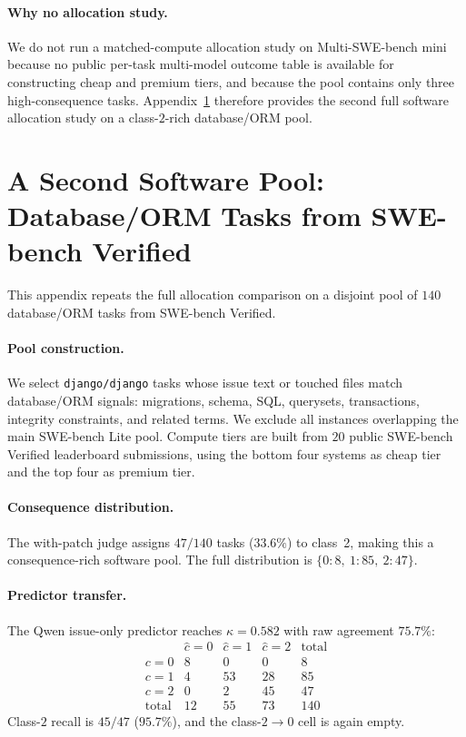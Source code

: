 \documentclass{article}
\begin{document}
\paragraph{Why no allocation study.}
We do not run a matched-compute allocation study on Multi-SWE-bench
mini because no public per-task multi-model outcome table is available
for constructing cheap and premium tiers, and because the pool contains
only three high-consequence tasks. Appendix~\ref{app:seconddomain}
therefore provides the second full software allocation study on a
class-$2$-rich database/ORM pool.

\section{A Second Software Pool: Database/ORM Tasks from SWE-bench Verified}
\label{app:seconddomain}

This appendix repeats the full allocation comparison on a disjoint
pool of $140$ database/ORM tasks from SWE-bench Verified.

\paragraph{Pool construction.}
We select \texttt{django/django} tasks whose issue text or touched
files match database/ORM signals: migrations, schema, SQL, querysets,
transactions, integrity constraints, and related terms. We exclude all
instances overlapping the main SWE-bench Lite pool. Compute tiers are
built from $20$ public SWE-bench Verified leaderboard submissions,
using the bottom four systems as cheap tier and the top four as
premium tier.

\paragraph{Consequence distribution.}
The with-patch judge assigns $47/140$ tasks ($33.6\%$) to class~2,
making this a consequence-rich software pool. The full distribution is
$\{0{:}8,\ 1{:}85,\ 2{:}47\}$.

\paragraph{Predictor transfer.}
The Qwen issue-only predictor reaches $\kappa=0.582$ with raw
agreement $75.7\%$:
\[
\begin{array}{c|ccc|c}
& \hat{c}=0 & \hat{c}=1 & \hat{c}=2 & \text{total} \\\hline
c=0 & 8 & 0 & 0 & 8 \\
c=1 & 4 & 53 & 28 & 85 \\
c=2 & 0 & 2 & 45 & 47 \\\hline
\text{total} & 12 & 55 & 73 & 140
\end{array}
\]
Class-$2$ recall is $45/47$ ($95.7\%$), and the class-$2\to0$ cell is
again empty.
\end{document}
